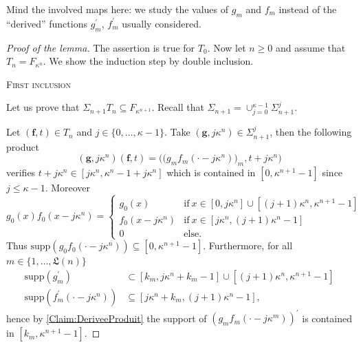 \documentclass[english, 11pt, a4paper]{article}
\theoremstyle{definition}
\numberwithin{equation}{section}
\newcommand{\mbff}{\boldsymbol{f}}
\newcommand{\mbfg}{\boldsymbol{g}}
\newcommand{\supp}{\mathrm{supp}}
\newcommand{\Landing}{\mathfrak{L}}
\begin{document}
Mind the involved maps here: we study the values of $g_m$ and $f_m$ instead of the
“derived” functions $g^{\prime}_m$, $f^{\prime}_m$ usually considered.

\begin{proof}[Proof of the lemma]
  The assertion is true for $T_0$. Now let $n\geq 0$ and assume that
  $T_{n}=F_{\kappa^n}$. We show the induction step by double inclusion.
  \begin{center}
    \small \textsc{First inclusion} 
  \end{center}
  Let us prove that  $\Sigma_{n+1}T_{n} \subseteq F_{\kappa^{n+1}}$. Recall that
  $\Sigma_{n+1}=\cup^{\kappa-1}_{j=0} 
  \Sigma^j_{n+1}$.
  
  Let $\left( \mbff , t \right) \in T_n$ and $j \in \{0,
  \ldots, \kappa-1\}$. Take $ \left(\mbfg , j\kappa^{n} \right) \in
  \Sigma^j_{n+1} $, then the following product 
  \begin{equation*}
    \left(\mbfg ,  j\kappa^n\right)\left(\mbff, t \right)
    =  \Big( \big(g_mf_m\left(\cdot -j\kappa^n\right)\big)_m,
    t+ j\kappa^n \Big)
  \end{equation*}
  verifies $t + j\kappa^n \in
  \left[j \kappa^n,\kappa^{n}-1 + j\kappa^n \right]$ which is contained in $\left[
    0,\kappa^{n+1}-1 \right]$ since $j\leq \kappa-1$. Moreover 
  \begin{equation*}
    g_0(x)f_0(x-j\kappa^n)=
    \begin{cases}
      g_0(x)& \text{if} \ x \in  \left[ 0, j \kappa^n \right]
      \cup \left[ (j+1)\kappa^n, \kappa^{n+1}-1 \right]\\
      f_0(x-j\kappa^n)& \text{if} \ x \in \left[j\kappa^n,(j+1)\kappa^n-1 \right] \\
      0 & \text{else}.
    \end{cases}
  \end{equation*}
  Thus $\supp(g_0f_0(\cdot- j\kappa^n)) \subseteq \left[0,\kappa^{n+1}-1\right]$.
  Furthermore, for all $m \in \{1, \ldots,\Landing (n)\}$
  \begin{align*}
    \supp(g^\prime_m)
    &\subset \left[k_m, j \kappa^n + k_m -1\right]
      \cup \left[(j+1)\kappa^n, \kappa^{n+1}-1 \right]\\
    \supp\left(f^\prime_m\left(\cdot-j\kappa^n \right) \right)
    &\subseteq [j\kappa^n +k_m,(j+1)\kappa^{n}-1],
  \end{align*}
  hence by \cref{Claim:DeriveeProduit} the support of ${\left(
      g_mf_{m}(\cdot-j\kappa^m) \right)}^\prime$ is contained in $[k_m,\kappa^{n+1}-1]$. 


\end{proof}
\end{document}
